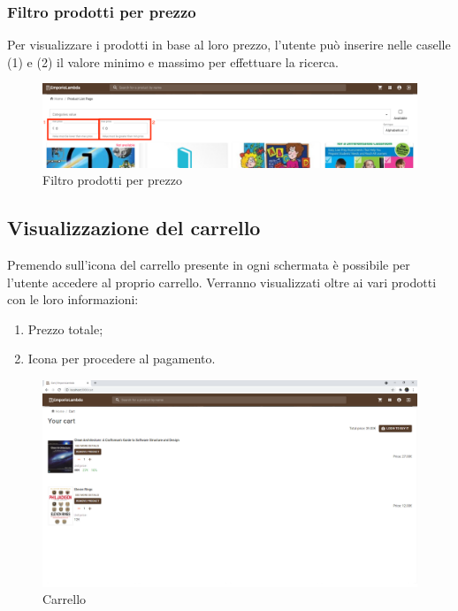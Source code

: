 \subsubsection{Filtro prodotti per prezzo}
Per visualizzare i prodotti in base al loro prezzo, l'utente può inserire nelle caselle (1) e (2) il valore minimo e massimo per effettuare la ricerca.
\begin{figure}[H]
	\centering
	\includegraphics[scale=0.25]{Immagini/Acquirente/plp-price.png}
	\caption{Filtro prodotti per prezzo}
	\label{fig:PLPprezzo}
\end{figure}
\subsection{Visualizzazione del carrello}
Premendo sull'icona del carrello presente in ogni schermata è possibile per l'utente accedere al proprio carrello. Verranno visualizzati oltre ai vari prodotti con le loro informazioni:
\begin{enumerate}
	\item Prezzo totale;
	\item Icona per procedere al pagamento.
\end{enumerate} 
\begin{figure}[H]
	\centering
	\includegraphics[scale=0.4]{Immagini/Acquirente/cart.customer.png}
	\caption{Carrello}
	\label{fig:Carrello}
\end{figure}
